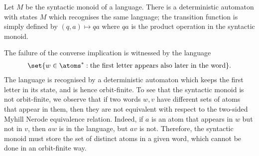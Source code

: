 %
%
%


	
	

% 
% 
% 

{ 
Let $M$ be the syntactic monoid of a language. There is a deterministic automaton with states $M$ which recognises the same language; the transition function is simply defined by $(q,a) \mapsto qa$ where $qa$ is the product operation in the syntactic monoid. 

The failure of the converse implication is witnessed by the language
\begin{align*}
	\set{w \in \atoms^* : \text{the first letter appears also later in the word}}.
\end{align*}
The language is recognised by a deterministic automaton which keeps the first letter in its state, and is hence orbit-finite. To see that the syntactic monoid is not orbit-finite, we observe that if two words $w,v$ have different sets of atoms that appear in them, then they are not equivalent with respect to the two-sided Myhill Nerode equivalence relation. Indeed, if $a$ is an atom that appears in $w$ but not in $v$, then $aw$ is in the language, but $av$ is not. Therefore, the syntactic monoid must store the set of distinct atoms in a given word, which cannot be done in an orbit-finite way. 
}

